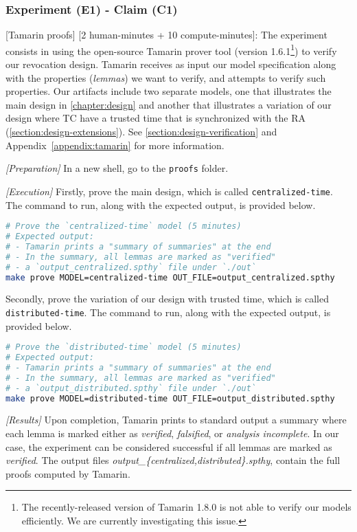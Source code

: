 \subsubsection{Experiment (E1) - Claim (C1)}
\label{artifact:proofs}
[Tamarin proofs] [2 human-minutes + 10 compute-minutes]: The experiment consists
in using the open-source Tamarin prover tool (version 1.6.1\footnote{The
recently-released version of Tamarin 1.8.0 is not able to verify our models
efficiently. We are currently investigating this issue.}) to verify our
revocation design. Tamarin receives as input our model specification along with
the properties (\textit{lemmas}) we want to verify, and attempts to verify such
properties. Our artifacts include two separate models, one that illustrates the
main design in \cref{chapter:design} and another that illustrates a variation of
our design where \acs{TC} have a trusted time that is synchronized with the
\acs{RA} (\cref{section:design-extensions}). See
\cref{section:design-verification} and Appendix~\ref{appendix:tamarin} for more
information.

\textit{[Preparation]} In a new shell, go to the \texttt{proofs} folder.

\textit{[Execution]} Firstly, prove the main design, which is called
\texttt{centralized-time}. The command to run, along with the expected output,
is provided below.

\begin{lstlisting}[language=bash]
# Prove the `centralized-time` model (5 minutes)
# Expected output: 
# - Tamarin prints a "summary of summaries" at the end
# - In the summary, all lemmas are marked as "verified"
# - a `output_centralized.spthy` file under `./out`
make prove MODEL=centralized-time OUT_FILE=output_centralized.spthy
\end{lstlisting}

Secondly, prove the variation of our design with trusted time, which is called
\texttt{distributed-time}. The command to run, along with the expected output,
is provided below.

\begin{lstlisting}[language=bash]
# Prove the `distributed-time` model (5 minutes)
# Expected output: 
# - Tamarin prints a "summary of summaries" at the end
# - In the summary, all lemmas are marked as "verified"
# - a `output_distributed.spthy` file under `./out`
make prove MODEL=distributed-time OUT_FILE=output_distributed.spthy
\end{lstlisting}
    
\textit{[Results]} Upon completion, Tamarin prints to standard output a summary
where each lemma is marked either as \emph{verified}, \emph{falsified}, or
\emph{analysis incomplete}. In our case, the experiment can be considered
successful if all lemmas are marked as \emph{verified}. The output files
\emph{output\_\{centralized,distributed\}.spthy}, contain the full proofs
computed by Tamarin.

